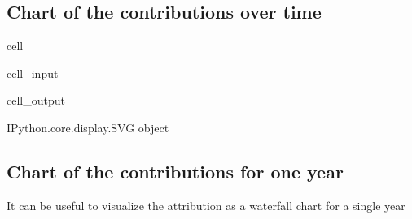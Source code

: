 \documentclass[letterpaper,10pt,english]{jupyterBook}
\begin{document}
\subsection{Chart of the contributions over time}
\label{\detokenize{content/06_ModelAnalytics/AttributionSomeFeatures:chart-of-the-contributions-over-time}}
\begin{sphinxuseclass}{cell}\begin{sphinxVerbatimInput}

\begin{sphinxuseclass}{cell_input}
\begin{sphinxVerbatim}[commandchars=\\\{\}]
 
     
\end{sphinxVerbatim}

\end{sphinxuseclass}\end{sphinxVerbatimInput}
\begin{sphinxVerbatimOutput}

\begin{sphinxuseclass}{cell_output}
\begin{sphinxVerbatim}[commandchars=\\\{\}]
\PYGZlt{}IPython.core.display.SVG object\PYGZgt{}
\end{sphinxVerbatim}

\end{sphinxuseclass}\end{sphinxVerbatimOutput}

\end{sphinxuseclass}

\subsection{Chart of the contributions for one year}
\label{\detokenize{content/06_ModelAnalytics/AttributionSomeFeatures:chart-of-the-contributions-for-one-year}}
\sphinxAtStartPar
It can be useful to visualize the attribution as a waterfall chart for a single year
\end{document}

